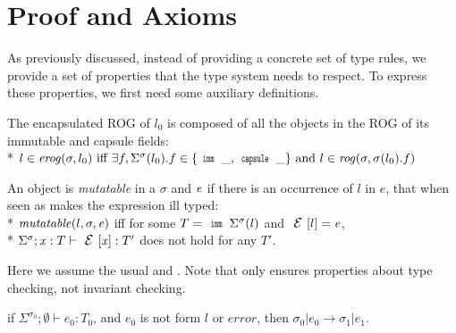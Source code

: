 \clearpage
\section{Proof and Axioms}
\label{s:proof}

As previously discussed, instead of providing a concrete set of type rules, we provide a set of properties
that the type system needs to respect.
To express these properties, we first need some auxiliary definitions.


The encapsulated ROG of $l_0$ is composed of all the objects
in the ROG of its immutable and capsule fields:\\*
\indent $l \in \mathit{erog}(\sigma,l_0)
\text{ iff } \exists f, \Sigma^\sigma(l_0).f \in \{\Kw{imm}\,\_,\Kw{capsule}\,\_\}
\text{ and } l \in \mathit{rog}(\sigma,\sigma(l_0).f)$%

\noindent An object is \emph{mutatable} in a $\sigma$ and  ${\mathit{e}}$ if there is an occurrence of 
$l$ in $e$, that when seen as \Q@imm@ makes the expression ill typed:\\*
\indent $\mathit{mutatable}(l,\sigma,{\mathit{e}})$ iff for some $T=\Kw{imm}\,\Sigma^\sigma(l)$ and $\ctx[l]=\e$,\\*
\indent \indent $\Sigma^\sigma;\x:T\vdash\ctx[\x]:T'$ does not hold for any $T'$.%



Here we assume the usual  and . Note that  only ensures properties about type checking, not invariant checking.\saveSpace\saveSpace
\begin{Assumption}[Progress]\rm
	if $\Sigma^{\sigma_0};\emptyset\vdash e_0: T_0$,
	and $e_0$ is not form $l$ or $\mathit{error}$, then
	$\sigma_0|e_0\rightarrow \sigma_1|e_1$.
\end{Assumption}

